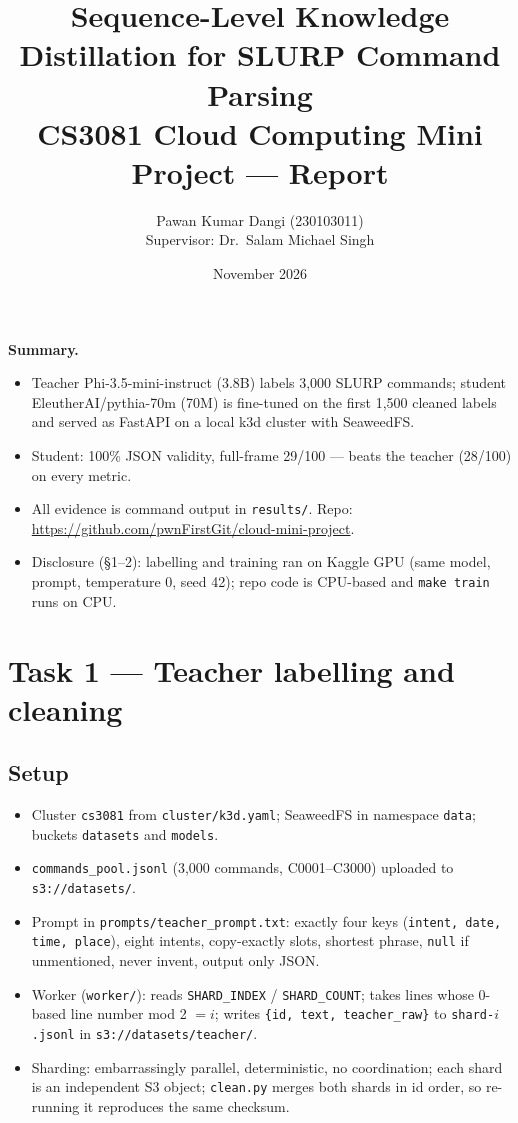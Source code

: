 \documentclass[11pt,a4paper]{article}
\title{\vspace{-1.2cm}Sequence-Level Knowledge Distillation for SLURP Command Parsing\\ \large CS3081 Cloud Computing Mini Project --- Report}
\author{Pawan Kumar Dangi (230103011)\\ Supervisor: Dr.\ Salam Michael Singh}
\date{November 2026}
\begin{document}
\maketitle
\vspace{-1.0cm}
\noindent\textbf{Summary.}
\begin{itemize}
\item Teacher Phi-3.5-mini-instruct (3.8B) labels 3,000 SLURP commands; student EleutherAI/pythia-70m (70M) is fine-tuned on the first 1,500 cleaned labels and served as FastAPI on a local k3d cluster with SeaweedFS.
\item Student: 100\% JSON validity, full-frame 29/100 --- beats the teacher (28/100) on every metric.
\item All evidence is command output in \texttt{results/}. Repo: \url{https://github.com/pwnFirstGit/cloud-mini-project}.
\item Disclosure (\S1--2): labelling and training ran on Kaggle GPU (same model, prompt, temperature 0, seed 42); repo code is CPU-based and \texttt{make train} runs on CPU.
\end{itemize}

\section{Task 1 --- Teacher labelling and cleaning}
\subsection*{Setup}
\begin{itemize}
\item Cluster \texttt{cs3081} from \texttt{cluster/k3d.yaml}; SeaweedFS in namespace \texttt{data}; buckets \texttt{datasets} and \texttt{models}.
\item \texttt{commands\_pool.jsonl} (3,000 commands, C0001--C3000) uploaded to \texttt{s3://datasets/}.
\item Prompt in \texttt{prompts/teacher\_prompt.txt}: exactly four keys (\texttt{intent, date, time, place}), eight intents, copy-exactly slots, shortest phrase, \texttt{null} if unmentioned, never invent, output only JSON.
\item Worker (\texttt{worker/}): reads \texttt{SHARD\_INDEX} / \texttt{SHARD\_COUNT}; takes lines whose 0-based line number mod 2 $=i$; writes \texttt{\{id, text, teacher\_raw\}} to \texttt{shard-$i$.jsonl} in \texttt{s3://datasets/teacher/}.
\item Sharding: embarrassingly parallel, deterministic, no coordination; each shard is an independent S3 object; \texttt{clean.py} merges both shards in id order, so re-running it reproduces the same checksum.
\end{itemize}
\end{document}
